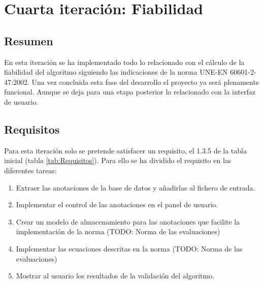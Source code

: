 
\section{Cuarta iteración: Fiabilidad}
    \subsection{Resumen}
        
        En esta iteración se ha implementado todo lo relacionado con el cálculo de la fiabilidad del algoritmo siguiendo las indicaciones de la norma UNE-EN 60601-2-47:2002. Una vez concluida esta fase del desarrollo el proyecto ya será plenamente funcional. Aunque se deja para una etapa posterior lo relacionado con la interfaz de usuario.
        
    \subsection{Requisitos}
    
        Para esta iteración solo se pretende satisfacer un requisito, el 1.3.5 de la tabla inicial (tabla \ref{tab:Requisitos}). Para ello se ha dividido el requisito en las diferentes tareas:
        
        \begin{enumerate}
            \item Extraer las anotaciones de la base de datos y añadirlas al fichero de entrada.
            \item Implementar el control de las anotaciones en el panel de usuario.
            \item Crear un modelo de almacenamiento para las anotaciones que facilite la implementación de la norma (TODO: Norma de las evaluaciones)
            \item Implementar las ecuaciones descritas en la norma (TODO: Norma de las evaluaciones)
            \item Mostrar al usuario los resultados de la validación del algoritmo.
        \end{enumerate}
    
